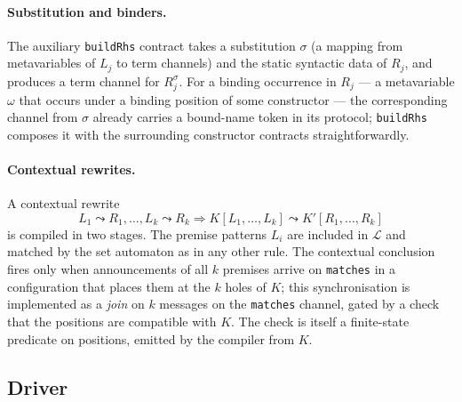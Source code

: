 \documentclass[11pt]{article}
\theoremstyle{plain}
\theoremstyle{definition}
\theoremstyle{remark}
\newcommand{\rew}{\leadsto}
\newcommand{\Lhs}{\mathcal{L}}
\begin{document}
\paragraph{Substitution and binders.}
The auxiliary \texttt{buildRhs} contract takes a substitution $\sigma$
(a mapping from metavariables of $L_j$ to term channels) and the static
syntactic data of $R_j$, and produces a term channel for $R_j^{\sigma}$.
For a binding occurrence in $R_j$ --- a metavariable $\omega$ that occurs
under a binding position of some constructor --- the corresponding
channel from $\sigma$ already carries a bound-name token in its
protocol; \texttt{buildRhs} composes it with the surrounding constructor
contracts straightforwardly.

\paragraph{Contextual rewrites.}
A contextual rewrite
\[
  L_1 \rew R_1, \ldots, L_k \rew R_k \Rightarrow K[L_1, \ldots, L_k] \rew K'[R_1, \ldots, R_k]
\]
is compiled in two stages. The premise patterns $L_i$ are included in
$\Lhs$ and matched by the set automaton as in any other rule. The
contextual conclusion fires only when announcements of all $k$ premises
arrive on \texttt{matches} in a configuration that places them at the
$k$ holes of $K$; this synchronisation is implemented as a \emph{join} on
$k$ messages on the \texttt{matches} channel, gated by a check that the
positions are compatible with $K$. The check is itself a finite-state
predicate on positions, emitted by the compiler from $K$.

\subsection{Driver}\label{ssec:driver}
\end{document}
